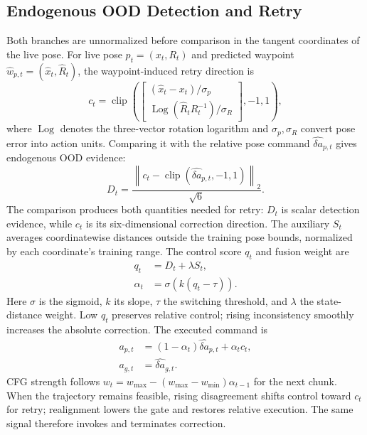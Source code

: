 \documentclass[letterpaper, 10 pt, conference]{ieeeconf}
\begin{document}
\subsection{Endogenous OOD Detection and Retry}
Both branches are unnormalized before comparison in the tangent coordinates of the live pose. For live pose $p_t=(x_t,R_t)$ and predicted waypoint $\hat{w}_{p,t}=(\hat{x}_t,\hat{R}_t)$, the waypoint-induced retry direction is
\begin{equation}
    c_t=\operatorname{clip}\!\left(
    \begin{bmatrix}
    (\hat{x}_t-x_t)/\sigma_p \\
    \operatorname{Log}(\hat{R}_tR_t^{-1})/\sigma_R
    \end{bmatrix},-1,1\right),
    \label{eq:recovery_vector}
\end{equation}
where $\operatorname{Log}$ denotes the three-vector rotation logarithm and $\sigma_p,\sigma_R$ convert pose error into action units. Comparing it with the relative pose command $\hat{\delta a}_{p,t}$ gives endogenous OOD evidence:
\begin{equation}
    D_t=\frac{\left\|c_t-
    \operatorname{clip}(\hat{\delta a}_{p,t},-1,1)\right\|_2}{\sqrt{6}}.
    \label{eq:disagreement}
\end{equation}
The comparison produces both quantities needed for retry: $D_t$ is scalar detection evidence, while $c_t$ is its six-dimensional correction direction. The auxiliary $S_t$ averages coordinatewise distances outside the training pose bounds, normalized by each coordinate's training range. The control score $q_t$ and fusion weight are
\begin{equation}
\begin{aligned}
    q_t &= D_t + \lambda S_t, \\
    \alpha_t &= \sigma(k(q_t-\tau)).
\end{aligned}
\end{equation}
Here $\sigma$ is the sigmoid, $k$ its slope, $\tau$ the switching threshold, and $\lambda$ the state-distance weight. Low $q_t$ preserves relative control; rising inconsistency smoothly increases the absolute correction. The executed command is
\begin{equation}
\begin{aligned}
    a_{p,t} &= (1-\alpha_t)\hat{\delta a}_{p,t} + \alpha_t c_t, \\
    a_{g,t} &= \hat{\delta a}_{g,t}.
\end{aligned}
    \label{eq:fused_action}
\end{equation}
CFG strength follows $w_t=w_{\max}-(w_{\max}-w_{\min})\alpha_{t-1}$ for the next chunk. When the trajectory remains feasible, rising disagreement shifts control toward $c_t$ for retry; realignment lowers the gate and restores relative execution. The same signal therefore invokes and terminates correction.
\end{document}
